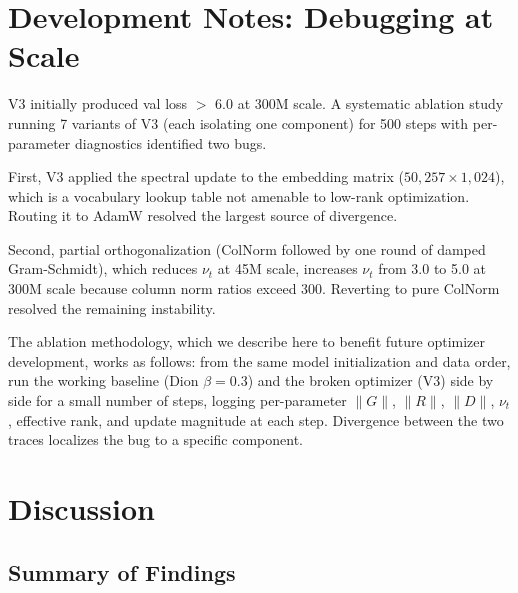 \documentclass[11pt]{article}
\newcommand{\norm}[1]{\|#1\|}
\begin{document}
\section{Development Notes: Debugging at Scale}
\label{sec:autopsy}

V3 initially produced val loss $>$ 6.0 at 300M scale. A systematic ablation study running 7 variants of V3 (each isolating one component) for 500 steps with per-parameter diagnostics identified two bugs.

First, V3 applied the spectral update to the embedding matrix ($50{,}257 \times 1{,}024$), which is a vocabulary lookup table not amenable to low-rank optimization. Routing it to AdamW resolved the largest source of divergence.

Second, partial orthogonalization (ColNorm followed by one round of damped Gram-Schmidt), which reduces $\nu_t$ at 45M scale, increases $\nu_t$ from 3.0 to 5.0 at 300M scale because column norm ratios exceed 300. Reverting to pure ColNorm resolved the remaining instability.

The ablation methodology, which we describe here to benefit future optimizer development, works as follows: from the same model initialization and data order, run the working baseline (Dion $\beta{=}0.3$) and the broken optimizer (V3) side by side for a small number of steps, logging per-parameter $\norm{G}$, $\norm{R}$, $\norm{D}$, $\nu_t$, effective rank, and update magnitude at each step. Divergence between the two traces localizes the bug to a specific component.

\section{Discussion}
\label{sec:discussion}

\subsection{Summary of Findings}
\end{document}
